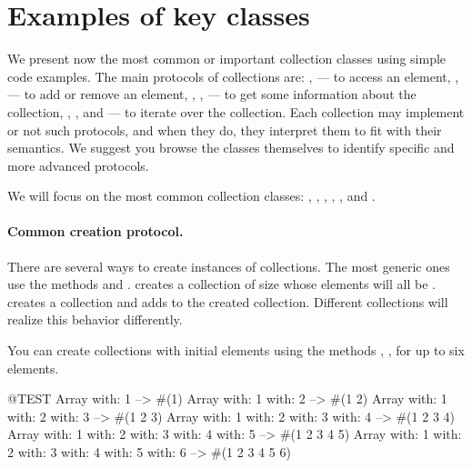 \documentclass[a4paper,10pt,twoside]{book}
\begin{document}
\section{Examples of key classes}
We present now the most common or important collection classes using simple code examples.
The main protocols of collections are: ,  --- to access an element, ,  --- to add or remove an element, , ,  --- to get some information about the collection, , , and  --- to iterate over the collection.
Each collection may implement or not such protocols, and when they do, they interpret them to fit with their semantics.
We suggest you browse the classes themselves to identify specific and more advanced protocols.

We will focus on the most common collection classes: , , , , , and .

\paragraph{Common creation protocol.}
There are several ways to create instances of collections.
The most generic ones use the methods  and .
 creates a collection of size  whose elements will all be .
  creates a collection and adds  to the created collection.
Different collections will realize this behavior differently.

You can create collections with initial elements using the methods , , \etc for up to six elements.

\begin{code}{@TEST}
Array with: 1 --> #(1)
Array with: 1 with: 2 --> #(1 2)
Array with: 1 with: 2 with: 3 --> #(1 2 3)
Array with: 1 with: 2 with: 3 with: 4 --> #(1 2 3 4)
Array with: 1 with: 2 with: 3 with: 4 with: 5 --> #(1 2 3 4 5)
Array with: 1 with: 2 with: 3 with: 4 with: 5 with: 6 --> #(1 2 3 4 5 6)
\end{code}
\end{document}
